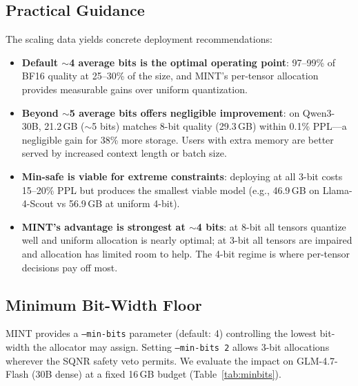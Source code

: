 \documentclass{article}
\begin{document}
\subsection{Practical Guidance}
\label{sec:practical_guidance}

The scaling data yields concrete deployment recommendations:
\begin{itemize}
    \item \textbf{Default ${\sim}$4 average bits is the optimal operating point}: 97--99\% of BF16 quality at 25--30\% of the size, and MINT's per-tensor allocation provides measurable gains over uniform quantization.
    \item \textbf{Beyond ${\sim}$5 average bits offers negligible improvement}: on Qwen3-30B, 21.2\,GB (${\sim}$5 bits) matches 8-bit quality (29.3\,GB) within 0.1\% PPL---a negligible gain for 38\% more storage. Users with extra memory are better served by increased context length or batch size.
    \item \textbf{Min-safe is viable for extreme constraints}: deploying at all 3-bit costs 15--20\% PPL but produces the smallest viable model (e.g., 46.9\,GB on Llama-4-Scout vs 56.9\,GB at uniform 4-bit).
    \item \textbf{MINT's advantage is strongest at ${\sim}$4 bits}: at 8-bit all tensors quantize well and uniform allocation is nearly optimal; at 3-bit all tensors are impaired and allocation has limited room to help. The 4-bit regime is where per-tensor decisions pay off most.
\end{itemize}

\subsection{Minimum Bit-Width Floor}
\label{sec:min_bits}

MINT provides a \texttt{--min-bits} parameter (default: 4) controlling the lowest bit-width the allocator may assign. Setting \texttt{--min-bits 2} allows 3-bit allocations wherever the SQNR safety veto permits. We evaluate the impact on GLM-4.7-Flash (30B dense) at a fixed 16\,GB budget (Table~\ref{tab:minbits}).
\end{document}
